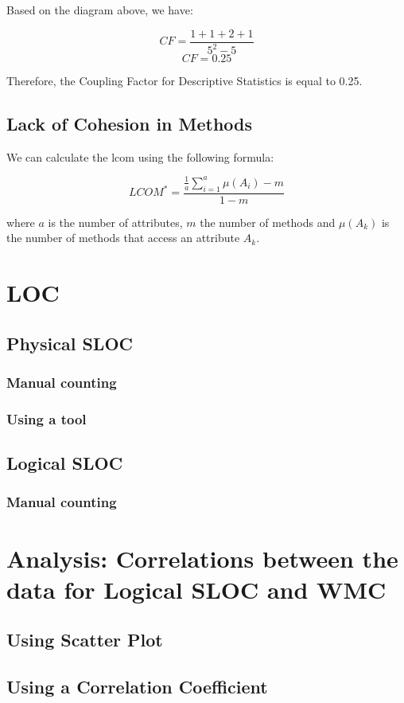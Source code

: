 \documentclass[11pt]{article}
\begin{document}
Based on the diagram above, we have:

$$ CF = \frac{1+1+2+1}{5^2-5} $$
$$ CF = 0.25 $$

Therefore, the Coupling Factor for Descriptive Statistics is equal to 0.25.

\subsection{Lack of Cohesion in Methods}

We can calculate the \gls{lcom} using the following formula:

$$ LCOM^{*} = \frac{\frac{1}{a}\sum\limits_{i=1}^{a} \mu(A_{i})-m}{1-m} $$

where $ a $ is the number of attributes, $ m $ the number of methods and $ \mu(A_{k}) $ is the number of methods that access an attribute $ A_{k} $.

\newpage

\section{LOC}

\subsection{Physical SLOC}

\subsubsection{Manual counting}

\subsubsection{Using a tool}

\subsection{Logical SLOC}

\subsubsection{Manual counting}

\newpage

\section{Analysis: Correlations between the data for Logical SLOC and WMC}

\subsection{Using Scatter Plot}

\subsection{Using a Correlation Coefficient}

\newpage

\printglossaries

\newpage



\end{document}
